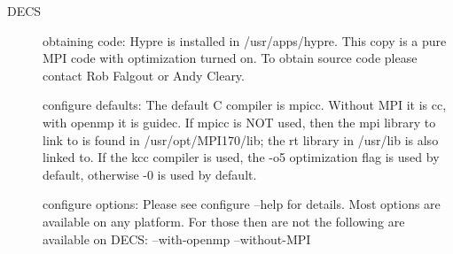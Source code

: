 \begin{description}
\item[DECS]
obtaining code:
\newline
Hypre is installed in /usr/apps/hypre.  This copy is a pure MPI code with optimization turned on. To obtain source code please contact Rob Falgout or Andy Cleary.
\newline

configure defaults:
\newline
The default C compiler is mpicc.  Without MPI it is cc, with openmp it is guidec.  If mpicc is NOT used, then the mpi library to link to is found in /usr/opt/MPI170/lib; the rt library in /usr/lib is also linked to.  If the kcc compiler is used, the -o5 optimization flag is used by default, otherwise -0 is used by default.   
\newline

configure options:
\newline
Please see configure --help for details.  Most options are available on any platform.  For those then are not the following are available on DECS:  --with-openmp --without-MPI 
\newline

\end{description}


